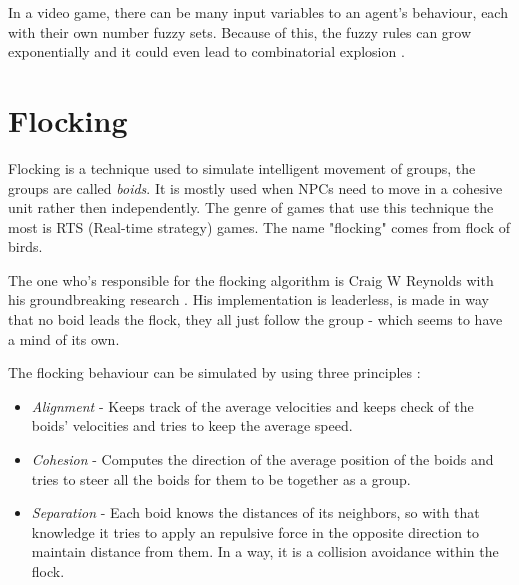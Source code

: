 \documentclass[a4paper, 12pt]{book}
\begin{document}
In a video game, there can be many input variables to an agent's behaviour, each with their own number fuzzy sets. Because of this, the fuzzy rules can grow exponentially and it could even lead to combinatorial explosion \cite{CombinatorialBombing}.

\section{Flocking}

Flocking is a technique used to simulate intelligent movement of groups, the groups are called \emph{boids}. It is mostly used when NPCs need to move in a cohesive unit rather then independently. The genre of games that use this technique the most is RTS (Real-time strategy) games. The name "flocking" comes from flock of birds.

The one who's responsible for the flocking algorithm is Craig W Reynolds with his groundbreaking research \cite{FlocksReynolds}. His implementation is leaderless, is made in way that no boid leads the flock, they all just follow the group - which seems to have a mind of its own.

The flocking behaviour can be simulated by using three principles \cite{FlockingBehaviour}: 
\begin{itemize}
    \item \emph{Alignment} - Keeps track of the average velocities and keeps check of the boids' velocities and tries to keep the average speed.
    \item \emph{Cohesion} - Computes the direction of the average position of the boids and tries to steer all the boids for them to be together as a group.
    \item \emph{Separation} - Each boid knows the distances of its neighbors, so with that knowledge it tries to apply an repulsive force in the opposite direction to maintain distance from them. In a way, it is a collision avoidance within the flock.
\end{itemize}
\end{document}
